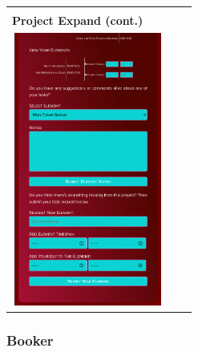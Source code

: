 \documentclass[11pt, english]{article}
\begin{document}
\begin{center}
\begin{longtable}{p{5cm}p{5cm}p{5cm}}
		& \\
		\textbf{Project Expand (cont.)}\\
		\includegraphics[width=5cm,height=9cm]{CS993_IMG/staff5.png}\\
        \end{longtable}
        \end{center}

\newpage

		\subsubsection{Booker}
\end{document}
